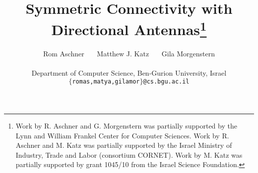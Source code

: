 \documentclass[11pt,letter]{article}
\newcommand{\old}[1]{{{}}}
\begin{document}
\title{Symmetric Connectivity with Directional Antennas\thanks{Work by R. Aschner and G. Morgenstern was partially supported by the Lynn and William Frankel Center for Computer Sciences. Work by R. Aschner and M. Katz was partially supported by the Israel Ministry of Industry, Trade and Labor (consortium CORNET). Work by M. Katz was partially supported by grant 1045/10 from the Israel Science Foundation.
}}

\author{Rom Aschner \ \ \ Matthew J. Katz \ \ \ Gila Morgenstern
\\
\\
{\small Department of Computer Science, Ben-Gurion University, Israel} \\
{\small {\tt $\{$romas,matya,gilamor$\}$@cs.bgu.ac.il}}}


\old{
\author{Rom Aschner\thanks{Partially supported by the Lynn and William Frankel Center for Computer Sciences, and by the Israel Ministry of Industry, Trade and Labor (consortium CORNET).} \ \ \ Matthew J. Katz\thanks{Partially supported by grant 1045/10 from the Israel Science Foundation, and by the Israel Ministry of Industry, Trade and Labor (consortium CORNET).} \ \ \ Gila Morgenstern\thanks{Partially supported by the Lynn and William Frankel Center for Computer Sciences.}
\\
{\small Department of Computer Science, Ben-Gurion University, Israel} \\
{\small {\tt $\{$romas,matya,gilamor$\}$@cs.bgu.ac.il}}}
}
\old{
\author{Rom Aschner\thanks{Dept. of Computer Science, Ben-Gurion University, Beer-Sheva 84105, Israel, {\tt romas@cs.bgu.ac.il}. Partially supported by the Lynn and William Frankel Center for Computer Sciences, and by the Israel Ministry of Industry, Trade and Labor (consortium CORNET).} \and Matthew J. Katz\thanks{Dept. of Computer Science, Ben-Gurion University, Beer-Sheva 84105, Israel, {\tt matya@cs.bgu.ac.il}. Partially supported by grant 1045/10 from the Israel Science Foundation, and by the Israel Ministry of Industry, Trade and Labor (consortium CORNET).} \and Gila Morgenstern\thanks{Dept. of Computer Science, Ben-Gurion University, Beer-Sheva 84105, Israel, {\tt gilamor@cs.bgu.ac.il}. Partially supported by the Lynn and William Frankel Center for Computer Sciences.}}
}


\maketitle
\end{document}
